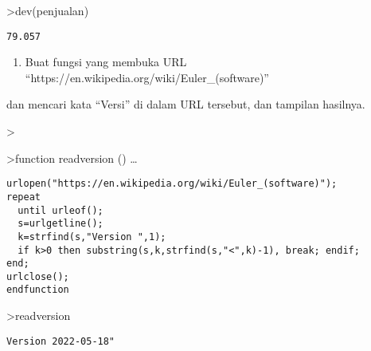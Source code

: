 \documentclass[
]{book}
\providecommand{\tightlist}{%
  \setlength{\itemsep}{0pt}\setlength{\parskip}{0pt}}
\begin{document}
\textgreater dev(penjualan)

\begin{verbatim}
79.057
\end{verbatim}

\begin{enumerate}
\def\labelenumi{\arabic{enumi}.}
\setcounter{enumi}{3}
\tightlist
\item
  Buat fungsi yang membuka URL ``https://en.wikipedia.org/wiki/Euler\_(software)''
\end{enumerate}

dan mencari kata ``Versi'' di dalam URL tersebut, dan tampilan hasilnya.

\textgreater{}

\textgreater function readversion () \ldots{}

\begin{verbatim}
urlopen("https://en.wikipedia.org/wiki/Euler_(software)");
repeat
  until urleof();
  s=urlgetline();
  k=strfind(s,"Version ",1);
  if k>0 then substring(s,k,strfind(s,"<",k)-1), break; endif;
end;
urlclose();
endfunction
\end{verbatim}

\textgreater readversion

\begin{verbatim}
Version 2022-05-18"
\end{verbatim}

\backmatter
\end{document}

